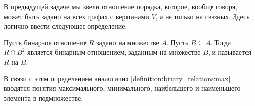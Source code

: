 В предыдущей задаче мы ввели отношение порядка, которое, вообще говоря, может быть задано на всех графах с вершинами $ V $, а не только на связных.
Здесь логично ввести следующее определение:

\begin{definition}
    Пусть бинарное отношение $ R $ задано на множестве $ A $.
    Пусть $ B \subseteq A $.
    Тогда $ R \cap B^2 $ является бинарным отношением, заданным на множестве $ B $,
    и называется  $ R $ на $ B $.
\end{definition}

В связи с этим определением аналогично \ref{definition:binary_relations:max} вводятся понятия максимального,
минимального, наибольшего и наименьшего элемента в подмножестве.
